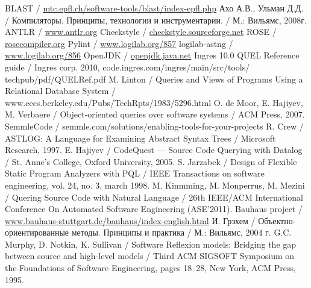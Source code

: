 \documentclass[10pt, a5paper]{article}
\begin{document}
\begin{thebibliography}{99}

BLAST / \url{mtc.epfl.ch/software-tools/blast/index-epfl.php}
Ахо А.В., Ульман Д.Д. / Компиляторы. Принципы, технологии и инструментарии. / М.: Вильямс, 2008г.
ANTLR / \url{www.antlr.org}
Checkstyle / \url{checkstyle.sourceforge.net}
ROSE / \url{rosecompiler.org}
Pylint / \url{www.logilab.org/857}
logilab-astng / \url{www.logilab.org/856}
OpenJDK / \url{openjdk.java.net}
Ingres 10.0 QUEL Reference guide / Ingres corp. 2010, code.ingres.com/ingres/main/src/tools/ techpub/pdf/QUELRef.pdf
M. Linton / Queries and Views of Programs Using a Relational Database System / www.eecs.berkeley.edu/Pubs/TechRpts/1983/5296.html
O. de Moor, E. Hajiyev, M. Verbaere / Object-oriented queries over software systems / ACM Press, 2007.
SemmleCode / semmle.com/solutions/enabling-tools-for-your-projects
R. Crew / ASTLOG: A Language for Examining Abstract Syntax Trees / Microsoft Research, 1997.
E. Hajiyev / CodeQuest --- Source Code Querying with Datalog / St. Anne’s College, Oxford University, 2005.
S. Jarzabek / Design of Flexible Static Program Analyzers with PQL / IEEE Transactions on software engineering, vol. 24, no. 3, march 1998.
M. Kinmming, M. Monperrus, M. Mezini / Quering Source Code with Natural Language / 26th IEEE/ACM International Conference On Automated Software Engineering (ASE'2011).
Bauhaus project / \url{www.bauhaus-stuttgart.de/bauhaus/index-english.html}
И. Грэхем / Объектно-ориентированные методы. Принципы и практика / М.: Вильямс, 2004 г.
 G.C. Murphy, D. Notkin, K. Sullivan / Software Reflexion models: Bridging the gap between source and high-level models / Third ACM SIGSOFT Symposium on the Foundations of Software Engineering, pages 18--28, New York, ACM Press, 1995.

\end{thebibliography}
\end{document}
